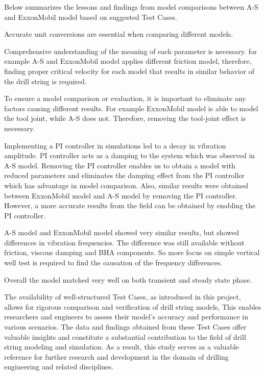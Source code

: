 Below summarizes the lessons and findings from model comparisons between A-S and ExxonMobil model based on suggested Test Cases.
\begin{bulletedlist}
    \item Accurate unit conversions are essential when comparing different models. 
    \item Comprehensive understanding of the meaning of each parameter is necessary. for example A-S and ExxonMobil model applies different friction model, therefore, finding proper critical velocity for each model that results in similar behavior of the drill string is required.
    \item To ensure a model comparison or evaluation, it is important to eliminate any factors causing different results. For example ExxonMobil model is able to model the tool joint, while A-S does not. Therefore, removing the tool-joint effect is necessary.
    \item Implementing a PI controller in simulations led to a decay in vibration amplitude. PI controller acts as a damping to the system which was observed in A-S model. Removing the PI controller enables us to obtain a model with reduced parameters and eliminates the damping effect from the PI controller which has advantage in model comparison. Also, similar results were obtained between ExxonMobil model and A-S model by removing the PI controller. However, a more accurate results from the field can be obtained by enabling the PI controller.
    \item A-S model and ExxonMobil model showed very similar results, but showed differences in vibration frequencies. The difference was still available without friction, viscous damping and BHA components. So more focus on simple vertical well test is required to find the causation of the frequency differences.
    \item Overall the model matched very well on both transient and steady state phase. 
\end{bulletedlist}

The availability of well-structured Test Cases, as introduced in this project, allows for rigorous comparison and verification of drill string models, This enables researchers and engineers to assess their model's accuracy and performance in various scenarios. The data and findings obtained from these Test Cases offer valuable insights and constitute a substantial contribution to the field of drill string modeling and simulation. As a result, this study serves as a valuable reference for further research and development in the domain of drilling engineering and related disciplines. 




